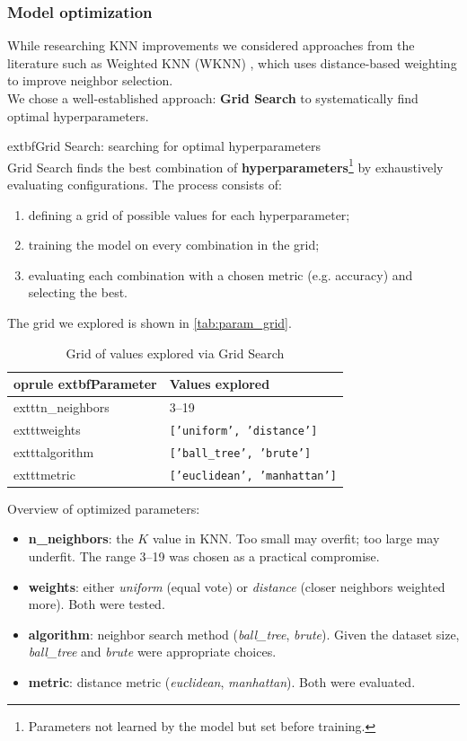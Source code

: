 \documentclass{article}
\begin{document}
\subsubsection{Model optimization}
While researching KNN improvements we considered approaches from the literature such as Weighted KNN (WKNN) \cite{electro}, which uses distance-based weighting to improve neighbor selection.\\
We chose a well-established approach: \textbf{Grid Search} to systematically find optimal hyperparameters.

    	extbf{Grid Search: searching for optimal hyperparameters}\\
Grid Search finds the best combination of \textbf{hyperparameters}\footnote{Parameters not learned by the model but set before training.} by exhaustively evaluating configurations.
The process consists of:
\begin{enumerate}
    \item defining a grid of possible values for each hyperparameter;
    \item training the model on every combination in the grid;
    \item evaluating each combination with a chosen metric (e.g. accuracy) and selecting the best.
\end{enumerate}

The grid we explored is shown in \autoref{tab:param_grid}.

\begin{table}[ht!]
\centering
\begin{tabular}{ll}
    	oprule
    	extbf{Parameter} & \textbf{Values explored} \\
    \midrule
    	exttt{n\_neighbors} & 3--19 \\
    	exttt{weights} & \texttt{['uniform', 'distance']} \\
    	exttt{algorithm} & \texttt{['ball\_tree', 'brute']} \\
    	exttt{metric} & \texttt{['euclidean', 'manhattan']} \\
    \bottomrule
\end{tabular}
\caption{Grid of values explored via Grid Search}
\label{tab:param_grid}
\end{table}

Overview of optimized parameters:
\begin{itemize}
    \item \textbf{n\_neighbors}: the $K$ value in KNN. Too small may overfit; too large may underfit. The range 3--19 was chosen as a practical compromise.
    \item \textbf{weights}: either \textit{uniform} (equal vote) or \textit{distance} (closer neighbors weighted more). Both were tested.
    \item \textbf{algorithm}: neighbor search method (\textit{ball\_tree}, \textit{brute}). Given the dataset size, \textit{ball\_tree} and \textit{brute} were appropriate choices.
    \item \textbf{metric}: distance metric (\textit{euclidean}, \textit{manhattan}). Both were evaluated.
\end{itemize}
\end{document}
